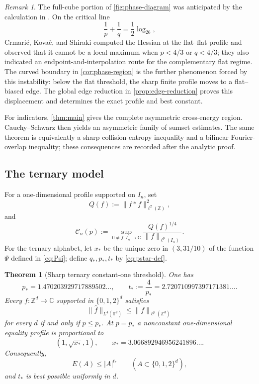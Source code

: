 \documentclass[11pt,reqno]{amsart}
\numberwithin{equation}{section}
\newtheorem{theorem}{Theorem}[section]
\theoremstyle{definition}
\theoremstyle{remark}
\newtheorem{remark}[remark]{Remark}
\newcommand{\Z}{\mathbb Z}
\newcommand{\T}{\mathbb T}
\newcommand{\C}{\mathbb C}
\newcommand{\logtwo}{\log_2}
\newcommand{\cC}{\mathcal C}
\begin{document}
\begin{remark}\label{rem:cks-flat-obstruction}
The full-cube portion of \cref{fig:phase-diagram} was anticipated by the calculation in \cite[Remark~15]{CKS}.  On the critical line
\[
  \frac1p+\frac1q=\frac12\logtwo 6,
\]
Crmari\'c, Kova\v{c}, and Shiraki computed the Hessian at the flat--flat profile and observed that it cannot be a local maximum when $p<4/3$ or $q<4/3$; they also indicated an endpoint-and-interpolation route for the complementary flat regime.  The curved boundary in \cref{cor:phase-region} is the further phenomenon forced by this instability: below the flat threshold, the sharp finite profile moves to a flat--biased edge.  The global edge reduction in \cref{prop:edge-reduction} proves this displacement and determines the exact profile and best constant.
\end{remark}

For indicators, \cref{thm:main} gives the complete asymmetric cross-energy region.  Cauchy--Schwarz then yields an asymmetric family of sumset estimates.  The same theorem is equivalently a sharp collision-entropy inequality and a bilinear Fourier-overlap inequality; these consequences are recorded after the analytic proof.

\subsection{The ternary model}
For a one-dimensional profile supported on $I_n$, set
\begin{equation}\label{eq:intro-Q}
  Q(f):=\|f*f\|_{\ell^2(\Z)}^2,
\end{equation}
and
\begin{equation}\label{eq:intro-Cn}
  \cC_n(p)
  :=\sup_{0\ne f\colon I_n\to\C}
  \frac{Q(f)^{1/4}}{\|f\|_{\ell^p(I_n)}}.
\end{equation}
For the ternary alphabet, let $x_*$ be the unique zero in $(3,31/10)$ of the function $\Psi$ defined in \eqref{eq:Psi}; define $q_*,p_*,t_*$ by \eqref{eq:pstar-def}.

\begin{theorem}[Sharp ternary constant-one threshold]\label{thm:intro-threshold}
One has
\[
  p_*=1.470203929717889502\ldots,
  \qquad
  t_*:=\frac4{p_*}=2.720710997397171381\ldots.
\]
Every $f\colon\Z^d\to\C$ supported in $\{0,1,2\}^d$ satisfies
\[
  \|\widehat f\|_{L^4(\T^d)}\le\|f\|_{\ell^p(\Z^d)}
\]
for every $d$ if and only if $p\le p_*$.  At $p=p_*$ a nonconstant one-dimensional equality profile is proportional to
\[
  (1,\sqrt{x_*},1),
  \qquad x_*=3.066892946956241896\ldots.
\]
Consequently,
\[
  E(A)\le |A|^{t_*}
  \qquad(A\subset\{0,1,2\}^d),
\]
and $t_*$ is best possible uniformly in $d$.
\end{theorem}
\end{document}
